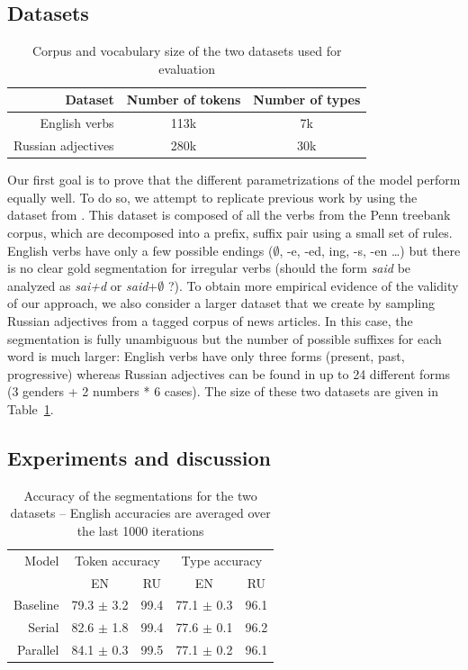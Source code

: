 \subsection{Datasets}
\begin{table}[h]
    \center
    \begin{tabular}{r c c}
        \toprule
        Dataset & Number of tokens & Number of types \\
        \midrule
  English verbs & 113k & 7k \\
        Russian adjectives & 280k & 30k \\
        \bottomrule
    \end{tabular}
    \caption{Corpus and vocabulary size of the two datasets used for evaluation}
    \label{tab:datasets}
\end{table}

Our first goal is to prove that the different parametrizations of the model perform equally well. To do so, we attempt to replicate previous work by using the dataset from \cite{goldwater2011}. This dataset is composed of all the verbs from the Penn treebank corpus, which are decomposed into a prefix, suffix pair using a small set of rules. English verbs have only a few possible endings ($\emptyset$, -e, -ed, ing, -s, -en \dots) but there is no clear gold segmentation for irregular verbs (should the form \textit{said} be analyzed as \textit{sai+d} or \textit{said}+$\emptyset$ ?). To obtain more empirical evidence of the validity of our approach, we also consider a larger dataset that we create by sampling Russian adjectives from a tagged corpus of news articles. In this case, the segmentation is fully unambiguous but the number of possible suffixes for each word is much larger: English verbs have only three forms (present, past, progressive) whereas Russian adjectives can be found in up to 24 different forms (3 genders + 2 numbers * 6 cases). The size of these two datasets are given in Table~\ref{tab:datasets}.

\subsection{Experiments and discussion}

\begin{table}[h]
    \center
    \begin{tabular}{r c c c c}
        \toprule
        Model & \multicolumn{2}{c}{Token accuracy} & \multicolumn{2}{c}{Type accuracy} \\
        \cmidrule(r){2-3} \cmidrule(r){4-5}
        & EN & RU & EN & RU \\
        \midrule
        Baseline & 79.3 $\pm$ 3.2 & 99.4 & 77.1 $\pm$ 0.3 & 96.1 \\
          Serial & 82.6 $\pm$ 1.8 & 99.4 & 77.6 $\pm$ 0.1 & 96.2 \\
        Parallel & 84.1 $\pm$ 0.3 & 99.5 & 77.1 $\pm$ 0.2 & 96.1 \\
        \bottomrule
    \end{tabular}
    \caption{Accuracy of the segmentations for the two datasets -- English accuracies are averaged over the last 1000 iterations}
    \label{tab:accuracy}
\end{table}

